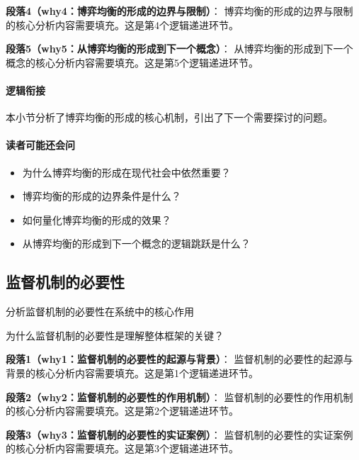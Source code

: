 \documentclass[../main.tex]{subfiles}
\begin{document}
\textbf{段落4（why4：博弈均衡的形成的边界与限制）}：
博弈均衡的形成的边界与限制的核心分析内容需要填充。这是第4个逻辑递进环节。


\textbf{段落5（why5：从博弈均衡的形成到下一个概念）}：
从博弈均衡的形成到下一个概念的核心分析内容需要填充。这是第5个逻辑递进环节。


\paragraph*{逻辑衔接}
本小节分析了博弈均衡的形成的核心机制，引出了下一个需要探讨的问题。

\paragraph*{读者可能还会问}
\begin{itemize}
\item 为什么博弈均衡的形成在现代社会中依然重要？
\item 博弈均衡的形成的边界条件是什么？
\item 如何量化博弈均衡的形成的效果？
\item 从博弈均衡的形成到下一个概念的逻辑跳跃是什么？
\end{itemize}


\subsection{监督机制的必要性}

\begin{motivation}
分析监督机制的必要性在系统中的核心作用
\end{motivation}

\begin{logicmap}
[逻辑链占位]
\end{logicmap}

\begin{questionbox}
为什么监督机制的必要性是理解整体框架的关键？
\end{questionbox}

\textbf{段落1（why1：监督机制的必要性的起源与背景）}：
监督机制的必要性的起源与背景的核心分析内容需要填充。这是第1个逻辑递进环节。


\textbf{段落2（why2：监督机制的必要性的作用机制）}：
监督机制的必要性的作用机制的核心分析内容需要填充。这是第2个逻辑递进环节。


\textbf{段落3（why3：监督机制的必要性的实证案例）}：
监督机制的必要性的实证案例的核心分析内容需要填充。这是第3个逻辑递进环节。
\end{document}
